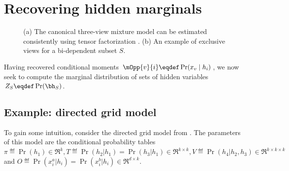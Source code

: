 \section{Recovering hidden marginals}
\label{sec:exclusiveViews}

\begin{figure}
  \centering

  \caption{(a) The canonical three-view mixture model can be estimated consistently
  using tensor factorization \citep{anandkumar13tensor}.
  (b) An example of exclusive views for a bi-dependent subset $S$.
  }
\end{figure}


Having recovered conditional moments $\mOpp{v}{i} \eqdef \Pr(x_v \mid h_i)$,
we now seek to compute the marginal distribution of sets of hidden variables
$Z_S \eqdef \Pr(\bh_S)$.

\subsection{Example: directed grid model}
\label{sec:directedExample}

To gain some intuition, consider the directed grid model from .
The parameters of this model are the conditional probability tables
$\pi \eqdef \Pr(h_1) \in \Re^k, T \eqdef \Pr(h_2 | h_1) = \Pr(h_3 | h_1) \in \Re^{k \times k},
V \eqdef \Pr(h_4 | h_2, h_3) \in \Re^{k \times k \times k}$ and $O \eqdef \Pr(x^a_i | h_i)
=  \Pr(x^b_i | h_i) \in \Re^{d \times k}$. 

